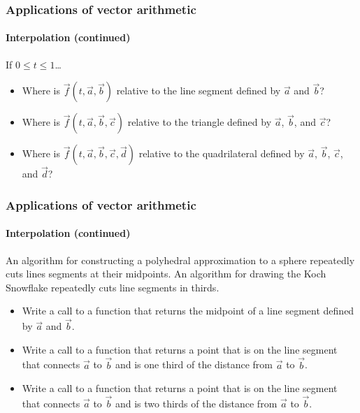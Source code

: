 \documentclass[xcolor=dvipsnames]{beamer}
\begin{document}
\begin{frame}
\frametitle{Applications of vector arithmetic}
\framesubtitle{Interpolation (continued)}

  If $0 \leq t \leq 1$\ldots
  \begin{itemize}
    \item Where is $\vec{f}(t, \vec{a}, \vec{b})$ relative
      to the line segment defined by $\vec{a}$ and $\vec{b}$?
    \item Where is $\vec{f}(t, \vec{a}, \vec{b}, \vec{c})$ relative
      to the triangle defined by $\vec{a}$, $\vec{b}$, and $\vec{c}$?
    \item Where is $\vec{f}(t, \vec{a}, \vec{b}, \vec{c}, \vec{d})$ relative
      to the quadrilateral defined by 
      $\vec{a}$, $\vec{b}$, $\vec{c}$, and $\vec{d}$?
    \end{itemize}

  \end{frame}

\begin{frame}
\frametitle{Applications of vector arithmetic}
\framesubtitle{Interpolation (continued)}

  An algorithm for constructing a polyhedral approximation
  to a sphere repeatedly cuts lines segments at their midpoints.
  An algorithm for drawing the Koch Snowflake repeatedly
  cuts line segments in thirds.

  \begin{itemize}
    \item Write a call to a function that returns the midpoint
      of a line segment defined by $\vec{a}$ and $\vec{b}$.
    \item Write a call to a function that returns a point
      that is on the line segment that connects $\vec{a}$ to
      $\vec{b}$ and is one third of the distance from 
      $\vec{a}$ to $\vec{b}$.
    \item Write a call to a function that returns a point
      that is on the line segment that connects $\vec{a}$ to
      $\vec{b}$ and is two thirds of the distance from 
      $\vec{a}$ to $\vec{b}$.
    \end{itemize}

  \end{frame}
\end{document}
